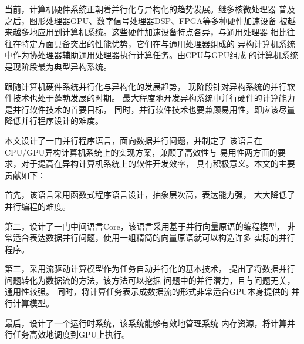 \begin{cabstract}
当前，计算机硬件系统正朝着并行化与异构化的趋势发展。继多核微处理器
普及之后，图形处理器GPU、数字信号处理器DSP、FPGA等多种硬件加速设备
被越来越多地应用到计算机系统。这些硬件加速设备特点各异，与通用处理器
相比往往在特定方面具备突出的性能优势，它们在与通用处理器组成的
异构计算机系统中作为协处理器辅助通用处理器执行计算任务。由CPU与GPU组成
的计算机系统是现阶段最为典型异构系统。

跟随计算机硬件系统并行化与异构化的发展趋势，
现阶段针对异构系统的并行软件技术也处于蓬勃发展的时期。
最大程度地开发异构系统中并行硬件的计算能力是并行软件技术的首要目标，
同时，并行软件技术也要兼顾易用性，即应该尽量降低并行程序设计的难度。

本文设计了一门并行程序语言，面向数据并行问题，并制定了
该语言在CPU/GPU异构计算机系统上的实现方案，兼顾了高效性与
易用性两方面的要求，对于提高在异构计算机系统上的软件开发效率，
具有积极意义。本文的主要贡献如下：

首先，该语言采用函数式程序语言设计，抽象层次高，表达能力强，
大大降低了并行编程的难度。

第二，设计了一门中间语言Core，该语言采用基于并行向量原语的编程模型，
非常适合表达数据并行问题，使用一组精简的向量原语就可以构造许多
实际的并行程序。

第三，采用流驱动计算模型作为任务自动并行化的基本技术，
提出了将数据并行问题转化为数据流的方法，该方法可以挖掘
问题中的并行潜力，且与问题无关，通用性较强。
同时，将计算任务表示成数据流的形式非常适合GPU本身提供的
并行计算模型。

最后，设计了一个运行时系统，该系统能够有效地管理系统
内存资源，将计算并行任务高效地调度到GPU上执行。


\end{cabstract}

